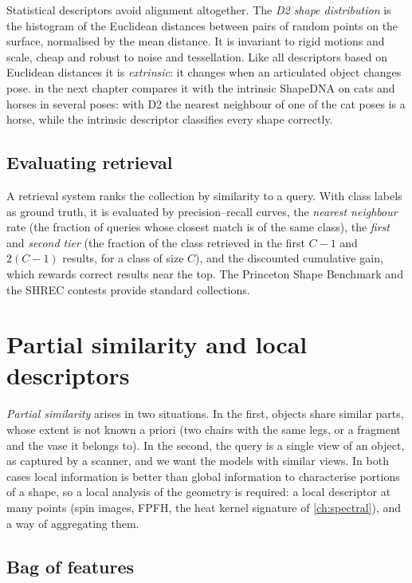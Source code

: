 Statistical descriptors avoid alignment altogether. The \emph{D2 shape distribution}
\citep{Osada2002} is the histogram of the Euclidean distances between pairs of random points on the
surface, normalised by the mean distance. It is invariant to rigid motions and scale, cheap and
robust to noise and tessellation. Like all descriptors based on Euclidean distances it is
\emph{extrinsic}: it changes when an articulated object changes pose.  in the next
chapter compares it with the intrinsic ShapeDNA on cats and horses in several poses: with D2 the
nearest neighbour of one of the cat poses is a horse, while the intrinsic descriptor classifies every
shape correctly.

\subsection{Evaluating retrieval}

A retrieval system ranks the collection by similarity to a query. With class labels as ground truth,
it is evaluated by precision--recall curves, the \emph{nearest neighbour} rate (the fraction of
queries whose closest match is of the same class), the \emph{first} and \emph{second tier} (the
fraction of the class retrieved in the first $C-1$ and $2(C-1)$ results, for a class of size $C$), and
the discounted cumulative gain, which rewards correct results near the top. The Princeton Shape
Benchmark \citep{Shilane2004} and the SHREC contests provide standard collections.

\section{Partial similarity and local descriptors}

\emph{Partial similarity} arises in two situations. In the first, objects share similar parts, whose
extent is not known a priori (two chairs with the same legs, or a fragment and the vase it belongs
to). In the second, the query is a single view of an object, as captured by a scanner, and we want the
models with similar views. In both cases local information is better than global information to
characterise portions of a shape, so a local analysis of the geometry is required: a local descriptor
at many points (spin images, FPFH, the heat kernel signature of \cref{ch:spectral}), and a way of
aggregating them.

\subsection{Bag of features}

